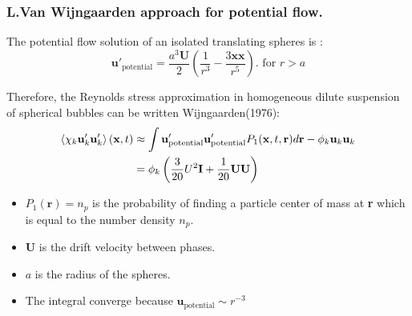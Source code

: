 \documentclass{sintefbeamer}
\begin{document}
\begin{frame}
  \frametitle{L.Van Wijngaarden approach for potential flow.}

The potential flow solution of an isolated translating spheres is :
\begin{equation*}
  \textbf{u}'_\text{potential}
  = \frac{a^3 \textbf{U}}{2}\left(\frac{1}{r^3} - \frac{3 \textbf{xx}}{r^5}\right).
  \text{    for    }r>a
\end{equation*}

Therefore, the Reynolds stress approximation in homogeneous dilute suspension of spherical bubbles can be written Wijngaarden(1976): 
  \begin{align*}
    \left<\chi_k \textbf{u}'_k\textbf{u}'_k\right>(\textbf{x},t)
    &\approx \int \textbf{u}'_\text{potential}\textbf{u}'_\text{potential}  P_1(\textbf{x},t,\textbf{r}) d\textbf{r}
    - \phi_k \textbf{u}_k\textbf{u}_k\\
    &= \phi_k \left(\frac{3}{20} U^2\textbf{I} + \frac{1}{20}\textbf{UU} \right)
\end{align*}


\begin{itemize}
  \item $P_1(\textbf{r}) = n_p$ is the probability of finding a particle center of mass at \textbf{r} which is equal to the number density $n_p$. 
  \item \textbf{U} is the drift velocity between phases. 
  \item $a$ is the radius of the spheres. 
  \item The integral converge because $\textbf{u}_\text{potential}  \sim r^{-3}$
\end{itemize}

\end{frame}
\end{document}
